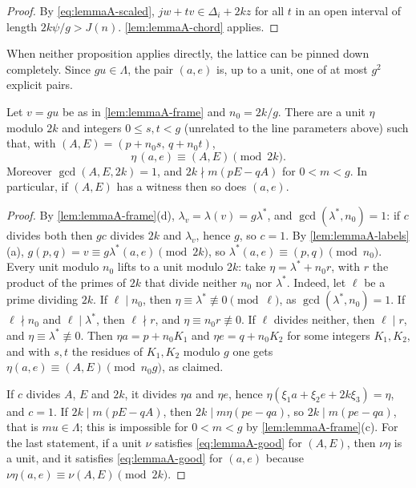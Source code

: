 \begin{proof}
By \eqref{eq:lemmaA-scaled}, $jw+tv\in\Delta_i+2kz$ for all $t$ in an open
interval of length $2k\psi/g>J(n)$. \autoref{lem:lemmaA-chord} applies.
\end{proof}

When neither proposition applies directly, the lattice can be pinned down
completely. Since $gu\in\Lambda$, the pair $(a,e)$ is, up to a unit, one of
at most $g^2$ explicit pairs.

\begin{lemma}
\label{lem:lemmaA-class}
Let $v=gu$ be as in \autoref{lem:lemmaA-frame} and $n_0=2k/g$. There are a
unit $\eta$ modulo $2k$ and integers $0\le s,t<g$ (unrelated to the line
parameters above) such that, with
$(A,E)=(p+n_0s,\,q+n_0t)$,
\[
\eta\,(a,e)\equiv(A,E)\pmod{2k}.
\]
Moreover $\gcd(A,E,2k)=1$, and $2k\nmid m(pE-qA)$ for $0<m<g$. In
particular, if $(A,E)$ has a witness then so does $(a,e)$.
\end{lemma}

\begin{proof}
By \autoref{lem:lemmaA-frame}(d), $\lambda_v=\lambda(v)=g\lambda^*$, and
$\gcd(\lambda^*,n_0)=1$: if $c$ divides both then $gc$ divides $2k$ and
$\lambda_v$, hence $g$, so $c=1$. By \autoref{lem:lemmaA-labels}(a),
$g(p,q)=v\equiv g\lambda^*(a,e)\pmod{2k}$, so
$\lambda^*(a,e)\equiv(p,q)\pmod{n_0}$. Every unit modulo $n_0$ lifts to a
unit modulo $2k$: take $\eta=\lambda^*+n_0r$, with $r$ the product of the
primes of $2k$ that divide neither $n_0$ nor $\lambda^*$. Indeed, let $\ell$ be
a prime dividing $2k$. If $\ell\mid n_0$, then $\eta\equiv\lambda^*\not\equiv0
\pmod\ell$, as $\gcd(\lambda^*,n_0)=1$. If $\ell\nmid n_0$ and
$\ell\mid\lambda^*$, then $\ell\nmid r$, and $\eta\equiv n_0r\not\equiv0$. If
$\ell$ divides neither, then $\ell\mid r$, and $\eta\equiv\lambda^*\not\equiv0$. Then
$\eta a=p+n_0K_1$ and $\eta e=q+n_0K_2$ for some integers $K_1,K_2$, and
with $s,t$ the residues of $K_1,K_2$ modulo $g$ one gets
$\eta(a,e)\equiv(A,E)\pmod{n_0g}$, as claimed.

If $c$ divides $A$, $E$ and $2k$, it divides $\eta a$ and $\eta e$, hence
$\eta(\xi_1 a+\xi_2 e+2k\xi_3)=\eta$, and $c=1$. If $2k\mid m(pE-qA)$, then
$2k\mid m\eta(pe-qa)$, so $2k\mid m(pe-qa)$, that is $mu\in\Lambda$; this is
impossible for $0<m<g$ by \autoref{lem:lemmaA-frame}(c). For the last
statement, if a unit $\nu$ satisfies \eqref{eq:lemmaA-good} for $(A,E)$, then
$\nu\eta$ is a unit, and it satisfies \eqref{eq:lemmaA-good} for $(a,e)$ because
$\nu\eta(a,e)\equiv \nu(A,E)\pmod{2k}$.
\end{proof}

